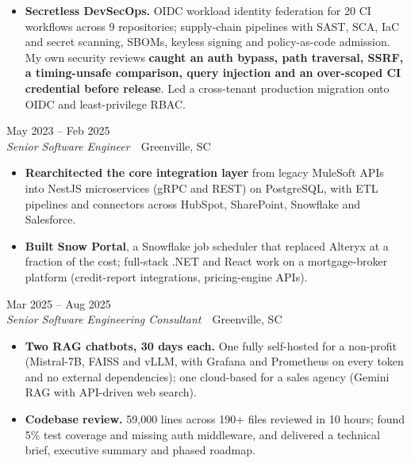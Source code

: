 \documentclass[10pt,letterpaper]{article}
\newcommand{\szmeta}{\fontsize{8pt}{10pt}\selectfont}
\begin{document}
\begin{itemize}
\item \textbf{Secretless DevSecOps.} OIDC workload identity federation for 20 CI workflows across 9 repositories; supply-chain pipelines with SAST, SCA, IaC and secret scanning, SBOMs, keyless signing and policy-as-code admission. My own security reviews \textbf{caught an auth bypass, path traversal, SSRF, a timing-unsafe comparison, query injection and an over-scoped CI credential before release}. Led a cross-tenant production migration onto OIDC and least-privilege RBAC.
\end{itemize}
\vspace{3pt}
 \hfill {\color{muted}\szmeta May 2023 – Feb 2025}\\[1pt]
{\itshape Senior Software Engineer}{\color{muted}\ \textbullet\ Greenville, SC}
\vspace{2pt}
\begin{itemize}
\item \textbf{Rearchitected the core integration layer} from legacy MuleSoft APIs into NestJS microservices (gRPC and REST) on PostgreSQL, with ETL pipelines and connectors across HubSpot, SharePoint, Snowflake and Salesforce.
\item \textbf{Built Snow Portal}, a Snowflake job scheduler that replaced Alteryx at a fraction of the cost; full-stack .NET and React work on a mortgage-broker platform (credit-report integrations, pricing-engine APIs).
\end{itemize}
\vspace{3pt}
 \hfill {\color{muted}\szmeta Mar 2025 – Aug 2025}\\[1pt]
{\itshape Senior Software Engineering Consultant}{\color{muted}\ \textbullet\ Greenville, SC}
\vspace{2pt}
\begin{itemize}
\item \textbf{Two RAG chatbots, 30 days each.} One fully self-hosted for a non-profit (Mistral-7B, FAISS and vLLM, with Grafana and Prometheus on every token and no external dependencies); one cloud-based for a sales agency (Gemini RAG with API-driven web search).
\item \textbf{Codebase review.} 59,000 lines across 190+ files reviewed in 10 hours; found 5\% test coverage and missing auth middleware, and delivered a technical brief, executive summary and phased roadmap.
\end{itemize}
\end{document}

